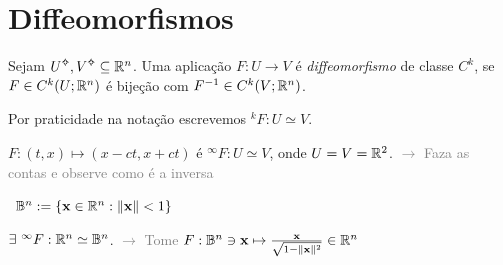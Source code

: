 \section{Diffeomorfismos} 

\begin{definition}
    Sejam \(U\ab, V\ab \subseteq \R^n\). Uma aplicação \(F:U \to V\) é \emph{diffeomorfismo} de classe \(C^k\), se \(F \in C^k(U;\mathbb{R}^n)\) é bijeção com \(F^{-1} \in C^k(V;\mathbb{R}^n)\).    
\end{definition}

\begin{note} 
    Por praticidade na notação escrevemos \(^kF: U\simeq V\).
\end{note}

\begin{example}
   \(F:(t,x)\mapsto (x-ct, x+ct ) \) é \(^\infty F: U\simeq V\), onde \(U=V=\mathbb{R}^2\). \textcolor{gray}{\(\rightarrow \) Faza as contas e observe como é a inversa} 
\end{example}

\begin{definition}
\centering \ \(\mathbb{B}^n:= \{\textbf{x} \in \mathbb{R}^n: \|\textbf{x}\| < 1\}\)
\end{definition}
\begin{example}
    \(\exists \ ^\infty F:\mathbb{R}^n \simeq \mathbb{B}^{n}\).  \textcolor{gray}{\(\rightarrow\) Tome \( F: \mathbb{B}^n  \ni \textbf{x} \mapsto \frac{\textbf{x}}{\sqrt{1-\|\textbf{x}\|^2}}\in \mathbb{R}^n\) }
\end{example}

     
